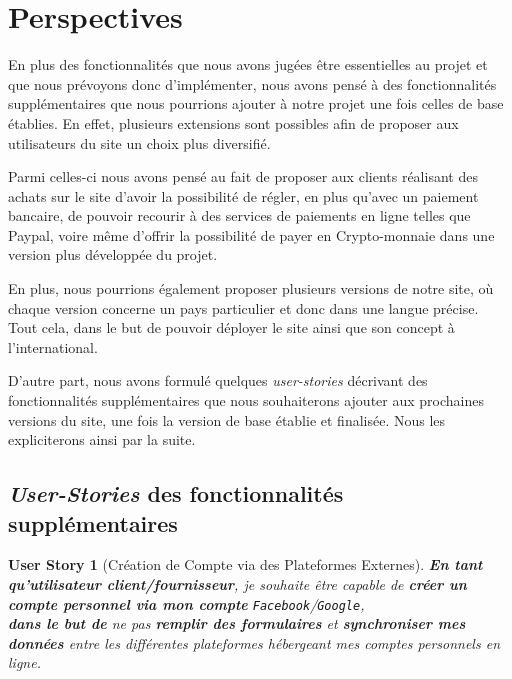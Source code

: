 \documentclass[a4paper,12pt]{book}
\theoremstyle{break}
\newtheorem*{userStory}{User Story}
\theoremstyle{break}
\theoremstyle{break}
\theoremstyle{break}
\theoremstyle{definition}
\theoremstyle{remark}
\begin{document}
\section{Perspectives}
\label{sec:perspectives}
En plus des fonctionnalités que nous avons jugées être essentielles au projet et que nous prévoyons donc d'implémenter, nous avons pensé à des fonctionnalités supplémentaires que nous pourrions ajouter à notre projet une fois celles de base établies. En effet, plusieurs extensions sont possibles afin de proposer aux utilisateurs du site un choix plus diversifié.

Parmi celles-ci nous avons pensé au fait de proposer aux clients réalisant des achats sur le site d'avoir la possibilité de régler, en plus qu'avec un paiement bancaire, de pouvoir recourir à des services de paiements en ligne telles que Paypal, voire même d'offrir la possibilité de payer en Crypto-monnaie dans une version plus développée du projet.

En plus, nous pourrions également proposer plusieurs versions de notre site, où chaque version concerne un pays particulier et donc dans une langue précise. Tout cela, dans le but de pouvoir déployer le site ainsi que son concept à l'international.

D'autre part, nous avons formulé quelques \textit{user-stories} décrivant des fonctionnalités supplémentaires que nous souhaiterons ajouter aux prochaines versions du site, une fois la version de base établie et finalisée. Nous les expliciterons ainsi par la suite.
\subsection{\textit{User-Stories} des fonctionnalités supplémentaires}
\begin{userStory}[Création de Compte via des Plateformes Externes]
\textbf{En tant qu'utilisateur {\color{green}client}/{\color{red}fournisseur}}, je souhaite être capable de \textbf{créer un compte personnel via mon compte} \texttt{Facebook}/\texttt{Google},\\
\indent
\textbf{dans le but de} ne pas \textbf{remplir des formulaires} et \textbf{synchroniser mes données} entre les différentes plateformes hébergeant mes comptes personnels en ligne.
\end{userStory}
\end{document}
